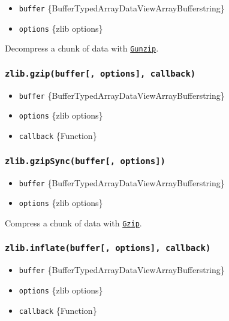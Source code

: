 \begin{itemize}
\tightlist
\item
  \texttt{buffer}
  \{Buffer\textbar TypedArray\textbar DataView\textbar ArrayBuffer\textbar string\}
\item
  \texttt{options} \{zlib options\}
\end{itemize}

Decompress a chunk of data with
\hyperref[class-zlibgunzip]{\texttt{Gunzip}}.

\subsubsection{\texorpdfstring{\texttt{zlib.gzip(buffer{[},\ options{]},\ callback)}}{zlib.gzip(buffer{[}, options{]}, callback)}}\label{zlib.gzipbuffer-options-callback}

\begin{itemize}
\tightlist
\item
  \texttt{buffer}
  \{Buffer\textbar TypedArray\textbar DataView\textbar ArrayBuffer\textbar string\}
\item
  \texttt{options} \{zlib options\}
\item
  \texttt{callback} \{Function\}
\end{itemize}

\subsubsection{\texorpdfstring{\texttt{zlib.gzipSync(buffer{[},\ options{]})}}{zlib.gzipSync(buffer{[}, options{]})}}\label{zlib.gzipsyncbuffer-options}

\begin{itemize}
\tightlist
\item
  \texttt{buffer}
  \{Buffer\textbar TypedArray\textbar DataView\textbar ArrayBuffer\textbar string\}
\item
  \texttt{options} \{zlib options\}
\end{itemize}

Compress a chunk of data with \hyperref[class-zlibgzip]{\texttt{Gzip}}.

\subsubsection{\texorpdfstring{\texttt{zlib.inflate(buffer{[},\ options{]},\ callback)}}{zlib.inflate(buffer{[}, options{]}, callback)}}\label{zlib.inflatebuffer-options-callback}

\begin{itemize}
\tightlist
\item
  \texttt{buffer}
  \{Buffer\textbar TypedArray\textbar DataView\textbar ArrayBuffer\textbar string\}
\item
  \texttt{options} \{zlib options\}
\item
  \texttt{callback} \{Function\}
\end{itemize}


